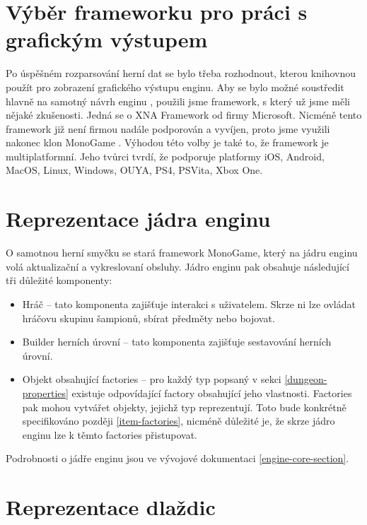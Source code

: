 
\section{Výběr frameworku pro práci s grafickým výstupem}

Po úspěšném rozparsování herní dat se bylo třeba rozhodnout, kterou knihovnou použít pro zobrazení grafického výstupu enginu. 
Aby se bylo možné soustředit hlavně na samotný návrh enginu , použili jsme framework, s který už jsme měli nějaké zkušenosti.
Jedná se o XNA Framework od firmy Microsoft. Nicméně tento framework již není firmou nadále podporován a vyvíjen, proto jsme využili 
nakonec klon MonoGame \cite{MonoGame}. Výhodou této volby je také to, že framework je multiplatformní. Jeho tvůrci tvrdí, že podporuje platformy
iOS, Android, MacOS, Linux, Windows, OUYA, PS4, PSVita, Xbox One.

\section{Reprezentace jádra enginu}\label{engine-core-section}

O samotnou herní smyčku se stará framework MonoGame, který na jádru enginu volá aktualizační a vykreslovaní obsluhy.
Jádro enginu pak obsahuje následující tři důležité komponenty:
\begin{itemize}
\item Hráč -- tato komponenta zajišťuje interakci s uživatelem. Skrze ni lze ovládat hráčovu skupinu šampionů, sbírat předměty nebo bojovat.
\item Builder herních úrovní -- tato komponenta zajišťuje sestavování herních úrovní.
\item Objekt obsahující factories -- pro každý typ popsaný v sekci \ref{dungeon-properties} existuje odpovídající
	factory obsahující jeho vlastnosti. Factories pak mohou vytvářet objekty, jejichž typ reprezentují. Toto bude konkrétně
	specifikováno později \vref{item-factories}, nicméně důležité je, že skrze jádro enginu lze k těmto factories přistupovat.
\end{itemize}
Podrobnosti o jádře enginu jsou ve vývojové dokumentaci \vref{engine-core-section}.

\section{Reprezentace dlaždic}\label{tile-representation}

